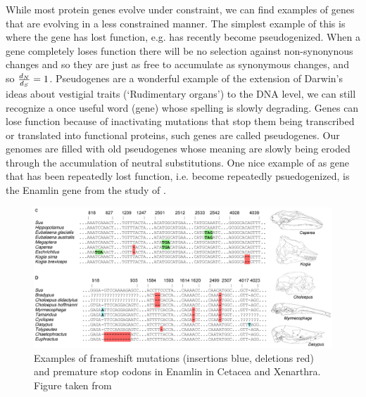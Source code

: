 While most protein genes evolve under constraint, we can find examples of
genes that are evolving in a less constrained manner. The simplest
example of this is where the gene has lost function, e.g. has recently
become pseudogenized. When a gene completely loses function there will be no
selection against non-synonynous changes and so they are just as free
to accumulate as synonymous changes, and so $\frac{d_N}{d_S}=1$.
Pseudogenes are a wonderful example of the extension of Darwin's ideas about vestigial traits (`Rudimentary organs') to the DNA level,
we can still recognize a once useful word (gene) whose spelling is slowly degrading.
Genes can lose function because of inactivating mutations that stop
them being transcribed or translated into functional proteins, such genes are
called pseudogenes. Our genomes are filled with old pseudogenes whose
meaning are slowly being eroded through the accumulation of neutral substitutions.
One nice example of as gene that has been repeatedly lost function,
i.e. become repeatedly psuedogenized, is
the Enamlin gene from the study of \citeauthor{Meredith:09}.

\begin{figure}
\begin{center}
\includegraphics[width=\textwidth]{Journal_figs/genetic_drift/Enamelin/Enamlin.pdf}
\end{center}
\caption{Examples of frameshift mutations (insertions blue, deletions
  red) and premature stop codons in Enamlin in Cetacea and
  Xenarthra. Figure taken from \citeauthor{Meredith:09}} \label{fig:Enamlin_coding}  
\end{figure} 

